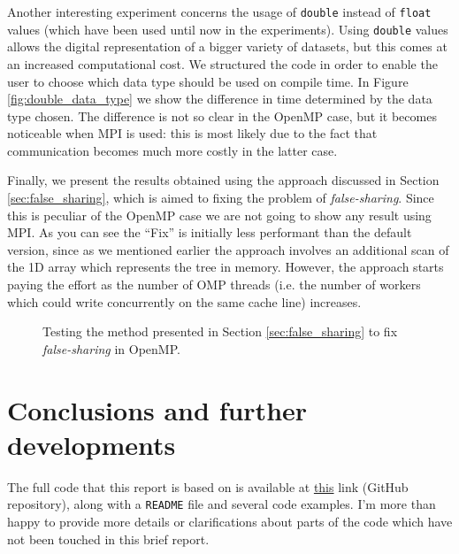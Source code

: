 \documentclass{article}
\begin{document}
Another interesting experiment concerns the usage of \texttt{double} instead of
\texttt{float} values (which have been used until now in the experiments). Using
\texttt{double} values allows the digital representation of a bigger variety
of datasets, but this comes at an increased computational cost. We structured
the code in order to enable the user to choose which data type should be used
on compile time. In Figure \ref{fig:double_data_type} we show the difference
in time determined by the data type chosen. The difference is not so clear in
the OpenMP case, but it becomes noticeable when MPI is used: this is most likely
due to the fact that communication becomes much more costly in the latter case.

Finally, we present the results obtained using the approach discussed in Section
\ref{sec:false_sharing}, which is aimed to fixing the problem of
\emph{false-sharing}. Since this is peculiar of the OpenMP case we are not going
to show any result using MPI. As you can see the ``Fix'' is initially less
performant than the default version, since as we mentioned earlier the approach
involves an additional scan of the 1D array which represents the tree in
memory. However, the approach starts paying the effort as the number of OMP
threads (i.e. the number of workers which could write concurrently on the same
cache line) increases.

\begin{figure}[t!]
    \centering
    \caption{Testing the method presented in Section \ref{sec:false_sharing} to fix \emph{false-sharing} in OpenMP.}
\end{figure}

\section{Conclusions and further developments}
The full code that this report is based on is available at
\href{https://github.com/fAndreuzzi/parallel-kd-tree}{this} link (GitHub
repository), along with a \texttt{README} file and several code examples. I'm
more than happy to provide more details or clarifications about parts of the
code which have not been touched in this brief report.
\end{document}
